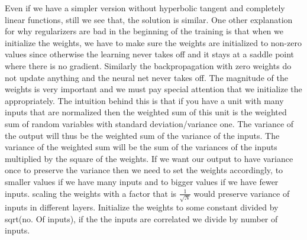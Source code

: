 Even if we have a simpler version without hyperbolic tangent and completely linear functions, still we see that, the solution is similar. One other explanation for why regularizers are bad in the beginning of the training is that when we initialize the weights, we have to make sure the weights are initialized to non-zero values since otherwise the learning never takes off and it stays at a saddle point where there is no gradient. Similarly the backpropagation with zero weights do not update anything and the neural net never takes off. The magnitude of the weights is very important and we must pay special attention that we initialize the appropriately. The intuition behind this is that if you have a unit with many inputs that are normalized then the weighted sum of this unit is the weighted sum of random variables with standard deviation/variance one. The variance of the output will thus be the weighted sum of the variance of the inputs. The variance of the weighted sum will be the sum of the variances of the inputs multiplied by the square of the weights. If we want our output to have variance once to preserve the variance then we need to set the weights accordingly, to smaller values if we have many inputs and to bigger values if we have fewer inputs. scaling the weights with a factor that is $\frac{1}{\sqrt{N}}$ would preserve variance of inputs in different layers. Initialize the weights to some constant divided by sqrt(no. Of inputs), if the the inputs are correlated we divide by number of inputs. 